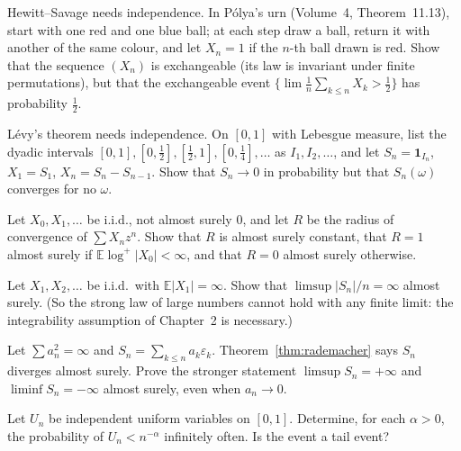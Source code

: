 \begin{exercise}[$\star$]\label{ex:polya}
Hewitt--Savage needs independence. In P\'olya's urn (Volume~4, Theorem~11.13), start with one red and one blue ball; at each step draw
a ball, return it with another of the same colour, and let $X_n=1$ if the $n$-th ball drawn is red. Show that the sequence $(X_n)$ is
exchangeable (its law is invariant under finite permutations), but that the exchangeable event $\{\lim\frac1n\sum_{k\le n}X_k>\frac12\}$
has probability $\frac12$.
\end{exercise}

\begin{exercise}[$\star\star$]\label{ex:levyindep}
L\'evy's theorem needs independence. On $[0,1]$ with Lebesgue measure, list the dyadic intervals $[0,1],[0,\frac12],[\frac12,1],
[0,\frac14],\dots$ as $I_1,I_2,\dots$, and let $S_n=\mathbf 1_{I_n}$, $X_1=S_1$, $X_n=S_n-S_{n-1}$. Show that $S_n\to0$ in probability but
that $S_n(\omega)$ converges for no $\omega$.
\end{exercise}

\begin{exercise}[$\star\star$]\label{ex:radius}
Let $X_0,X_1,\dots$ be i.i.d., not almost surely $0$, and let $R$ be the radius of convergence of $\sum X_nz^n$. Show that $R$ is almost surely
constant, that $R=1$ almost surely if $\mathbb E\log^+|X_0|<\infty$, and that $R=0$ almost surely otherwise.
\end{exercise}

\begin{exercise}[$\star\star$]\label{ex:infmean}
Let $X_1,X_2,\dots$ be i.i.d.\ with $\mathbb E|X_1|=\infty$. Show that $\limsup|S_n|/n=\infty$ almost surely. (So the strong law of large
numbers cannot hold with any finite limit: the integrability assumption of Chapter~2 is necessary.)
\end{exercise}

\begin{exercise}[$\star\star\star$]\label{ex:unbounded}
Let $\sum a_n^2=\infty$ and $S_n=\sum_{k\le n}a_k\varepsilon_k$. Theorem~\ref{thm:rademacher} says $S_n$ diverges almost surely. Prove the
stronger statement $\limsup S_n=+\infty$ and $\liminf S_n=-\infty$ almost surely, even when $a_n\to0$.
\end{exercise}


\begin{exercise}[$\star$]\label{ex:v11-ch01-rare}
Let $U_n$ be independent uniform variables on $[0,1]$. Determine, for each $\alpha>0$, the probability of $U_n<n^{-\alpha}$ infinitely often. Is the event a tail event?
\end{exercise}

